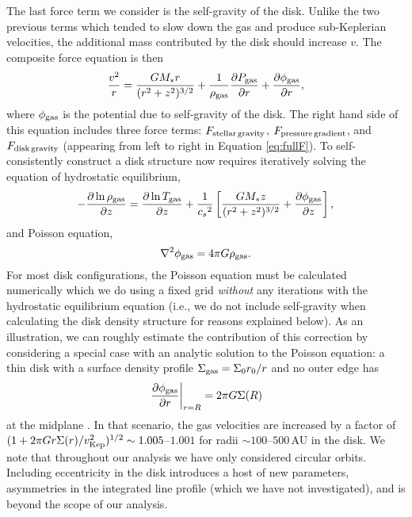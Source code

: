The last force term we consider is the self-gravity of the disk.  Unlike the two
previous terms which tended to slow down the gas and produce sub-Keplerian 
velocities, the additional mass contributed by the disk should increase $v$.  
The composite force equation is then
\begin{equation}
\frac{v^2}{r} = \frac{G M_\ast r}{(r^2 + z^2)^{3/2}} + \frac{1}{\rho_{\rm gas}}\frac{\partial P_{\rm gas}}{\partial r} + \frac{\partial \phi_{\rm gas}}{\partial r},
\label{eq:fullF}
\end{equation} 
where $\phi_{\rm gas}$ is the potential due to self-gravity of the disk.  The 
right hand side of this equation includes three force terms: 
$F_{\rm stellar\,gravity}$, $F_{\rm pressure\,gradient}$, and 
$F_{\rm disk\,gravity}$ (appearing from left to right in Equation 
\ref{eq:fullF}).  To self-consistently construct a disk structure now requires 
iteratively solving the equation of hydrostatic equilibrium,
\begin{equation}
-\frac{\partial \ln \rho_{\rm gas}}{\partial z} = \frac{\partial\ln T_{\rm gas}}{\partial z} +  \frac{1}{{c_s}^2}\left[\frac{G M_\ast z}{(r^2 + z^2)^{3/2}} + 
\frac{\partial \phi_{\rm gas}}{\partial z}\right],
\end{equation}
and Poisson equation,
\begin{equation}
\nabla^2 \phi_{\rm gas} = 4 \pi G \rho_{\rm gas}.
\end{equation}
For most disk configurations, the Poisson equation must be calculated 
numerically which we do using a fixed grid \citep{swarztrauber75} 
{\it without} any iterations with the hydrostatic equilibrium equation (i.e., we
do not include self-gravity when calculating the disk density structure for 
reasons explained below).  As an illustration, we can roughly estimate the
contribution of this correction by considering a special case with an analytic 
solution to the Poisson equation: a thin disk with a surface density profile 
$\Sigma_{\rm gas} = \Sigma_0 r_0 /r$ and no outer edge has 
\begin{equation}
\left.\frac{\partial \phi_{\rm gas}}{\partial r}\right|_{r=R} = 2\pi G\Sigma(R)
\end{equation}
at the midplane \citep{mestel63,lodato07}.  In that scenario, the gas velocities
are increased by a factor of 
$(1+ 2\pi Gr\Sigma(r)/ v_{\rm Kep}^2)^{1/2} \sim 1.005$--$1.001$ for radii 
$\sim 100$--$500$\,AU in the disk.  We note that throughout our analysis we have
only considered circular orbits.  Including eccentricity in the disk 
\citep[e.g.,][]{regaly11} introduces a host of new parameters, asymmetries in the
integrated line profile (which we have not investigated), and is beyond the 
scope of our analysis.

